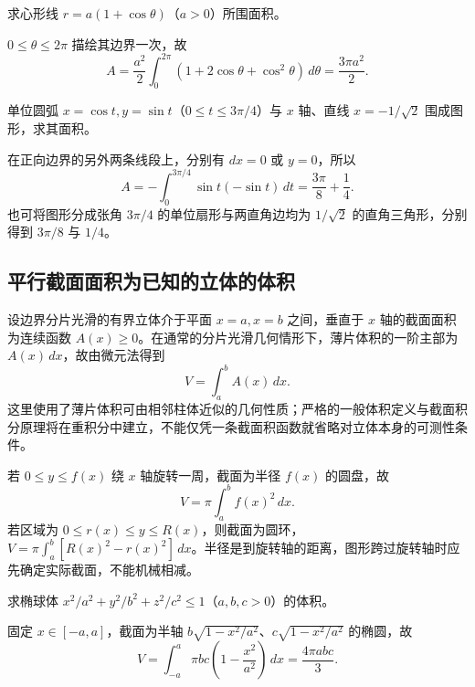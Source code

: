 \begin{example}
\label{ex:cardioid-polar-area}
求心形线 $r=a(1+\cos\theta)$（$a>0$）所围面积。
\end{example}
\begin{solve}
$0\leq\theta\leq2\pi$ 描绘其边界一次，故
\[
    A=\frac{a^2}{2}\int_0^{2\pi}(1+2\cos\theta+\cos^2\theta)\,d\theta
    =\frac{3\pi a^2}{2}.
\]
\end{solve}

\begin{example}
\label{ex:circular-arc-area-two-methods}
单位圆弧 $x=\cos t,y=\sin t$（$0\leq t\leq3\pi/4$）与 $x$ 轴、直线 $x=-1/\sqrt2$ 围成图形，求其面积。
\end{example}
\begin{solve}
在正向边界的另外两条线段上，分别有 $dx=0$ 或 $y=0$，所以
\[
    A=-\int_0^{3\pi/4}\sin t(-\sin t)\,dt
    =\frac{3\pi}{8}+\frac14.
\]
也可将图形分成张角 $3\pi/4$ 的单位扇形与两直角边均为 $1/\sqrt2$ 的直角三角形，分别得到 $3\pi/8$ 与 $1/4$。
\end{solve}

\subsection{平行截面面积为已知的立体的体积}
\label{subsec:volumes-from-parallel-cross-sections}

设边界分片光滑的有界立体介于平面 $x=a,x=b$ 之间，垂直于 $x$ 轴的截面面积为连续函数 $A(x)\geq0$。在通常的分片光滑几何情形下，薄片体积的一阶主部为 $A(x)\,dx$，故由微元法得到
\begin{equation}
    V=\int_a^b A(x)\,dx.
    \label{eq:volume-by-cross-sections}
\end{equation}
这里使用了薄片体积可由相邻柱体近似的几何性质；严格的一般体积定义与截面积分原理将在重积分中建立，不能仅凭一条截面积函数就省略对立体本身的可测性条件。

若 $0\leq y\leq f(x)$ 绕 $x$ 轴旋转一周，截面为半径 $f(x)$ 的圆盘，故
\[
    V=\pi\int_a^b f(x)^2\,dx.
\]
若区域为 $0\leq r(x)\leq y\leq R(x)$，则截面为圆环，$V=\pi\int_a^b[R(x)^2-r(x)^2]\,dx$。半径是到旋转轴的距离，图形跨过旋转轴时应先确定实际截面，不能机械相减。

\begin{example}
\label{ex:ellipsoid-volume-cross-sections}
求椭球体 $x^2/a^2+y^2/b^2+z^2/c^2\leq1$（$a,b,c>0$）的体积。
\end{example}
\begin{solve}
固定 $x\in[-a,a]$，截面为半轴 $b\sqrt{1-x^2/a^2}$、$c\sqrt{1-x^2/a^2}$ 的椭圆，故
\[
    V=\int_{-a}^a\pi bc\left(1-\frac{x^2}{a^2}\right)\,dx
    =\frac{4\pi abc}{3}.
\]
\end{solve}

